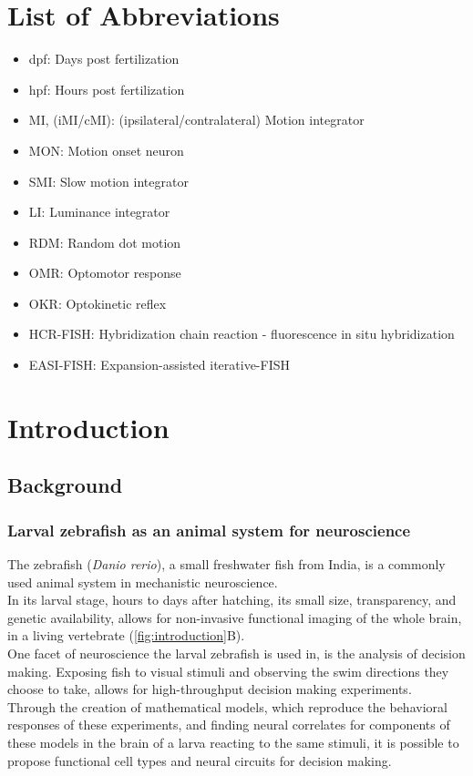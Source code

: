 \documentclass[12pt, a4paper, oneside]{article}
\begin{document}
\section*{List of Abbreviations}
\begin{itemize}[itemsep=0.25pt, label={}, leftmargin=0pt]
	\item dpf: Days post fertilization
	\item hpf: Hours post fertilization
	\item MI, (iMI/cMI): (ipsilateral/contralateral) Motion integrator
	\item MON: Motion onset neuron
	\item SMI: Slow motion integrator
	\item LI: Luminance integrator
	\item RDM: Random dot motion
	\item OMR: Optomotor response
	\item OKR: Optokinetic reflex
	\item HCR-FISH: Hybridization chain reaction - fluorescence in situ hybridization
	\item EASI-FISH: Expansion-assisted iterative-FISH
\end{itemize}


\clearpage

\section{Introduction}

\subsection{Background}

\subsubsection{Larval zebrafish as an animal system for neuroscience}
The zebrafish (\textit{Danio rerio}), a small freshwater fish from India, is a commonly used animal system in mechanistic neuroscience.\\
In its larval stage, hours to days after hatching, its small size, transparency, and genetic availability, allows for non-invasive functional imaging of the whole brain, in a living vertebrate (\autoref{fig:introduction}B).\\

One facet of neuroscience the larval zebrafish is used in, is the analysis of decision making. Exposing fish to visual stimuli and observing the swim directions they choose to take, allows for high-throughput decision making experiments.\\
Through the creation of mathematical models, which reproduce the behavioral responses of these experiments, and finding neural correlates for components of these models in the brain of a larva reacting to the same stimuli, it is possible to propose functional cell types and neural circuits for decision making.\\
\end{document}
